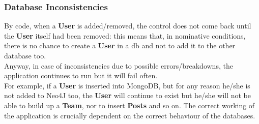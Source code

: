 \subsubsection{Database Inconsistencies}
By code, when a \textbf{User} is added/removed, the control does not come back until the \textbf{User} itself had been removed: this means that, in nominative conditions, there is no chance to create a \textbf{User} in a db and not to add it to the other database too.\\
Anyway, in case of inconsistencies due to possible errors/breakdowns, the application continues to run but it will fail often.\\
For example, if a \textbf{User} is inserted into MongoDB, but for any reason he/she is not added to Neo4J too, the \textbf{User} will continue to exist but he/she will not be able to build up a \textbf{Team}, nor to insert \textbf{Posts} and so on. The correct working of the application is crucially dependent on the correct behaviour of the databases.

